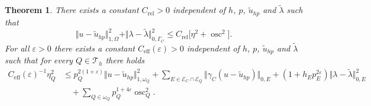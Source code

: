 \documentclass[12pt,twoside,reqno]{amsart}
\newtheorem{theorem}{Theorem}[section]
\theoremstyle{definition}
\numberwithin{equation}{section}
\newcommand  {\T}   {\mathscr T}
\newcommand{\norm}[1]    {\Vert #1 \Vert}
\begin{document}
 \begin{theorem}\label{thm: A posteriori Friction}
   There exists a constant $C_{\text{rel}}>0$ independent of $h$, $p$, $\tilde{u}_{hp}$ and $\tilde{\lambda}$ such that
  \begin{equation} \label{eq:fric:eta_reliable}
    \norm{u-\tilde{u}_{hp}}_{1,\Omega}^2+\norm{\lambda-\tilde{\lambda}}_{0,\Gamma_C}^2\leq C_{\text{rel}}\bigl[\eta^2+\operatorname{osc}^2\bigr].
\end{equation}
 For all $\varepsilon > 0$ there exists a constant $C_{\text{eff}}(\varepsilon)>0$ independent of $h$, $p$, $\tilde{u}_{hp}$ and $\tilde{\lambda}$ such that for every $Q \in \T_h$ there holds
    \begin{align}
        C_{\text{eff}}(\varepsilon)^{-1}\eta^2_Q & \leq   p_Q^{2(1+\varepsilon)} \norm{u-\tilde{u}_{hp}}^2_{1,\omega_Q} + \sum\limits_{E\in \mathcal{E}_C\cap\mathcal{E}_Q} \norm{\gamma_C(u-\tilde{u}_{hp})}_{0,E} + \left(1 + h_E p_E^{2\varepsilon} \right)\norm{\lambda - \tilde{\lambda}}^2_{0,E} \nonumber  \\
         & \quad  + \sum_{Q \in \omega_Q} p_Q^{1+4\varepsilon} \operatorname{osc}_Q^2. \label{eq:fric:effi} 
    \end{align}
 \end{theorem}
\end{document}
